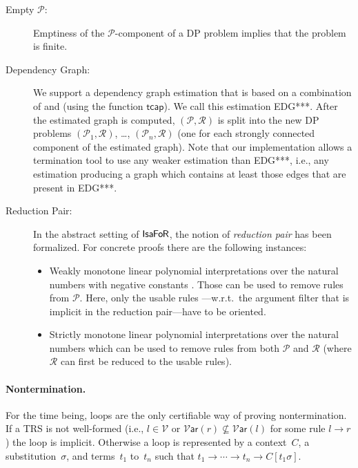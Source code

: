 \documentclass[a4paper,final]{easychair}
\theoremstyle{definition}
\newcommand\formatID[1]{\ensuremath{{\sf#1}}}
\newcommand\IsaFoR{\formatID{Isa\kern-0.10exF\kern-0.10exo\kern-0.10exR}}
\newcommand\RR{\mathcal{R}}
\newcommand\PP{\mathcal{P}}
\newcommand\tcap{\mathsf{tcap}}
\newcommand\Var{\mathcal{V}\mathsf{ar}}
\newcommand\Vars{\mathcal{V}}
\begin{document}
\begin{description}
\item[Empty $\PP$:] Emptiness of the $\PP$-component of a DP problem implies
that the problem is finite.

\item[Dependency Graph:] We support a dependency graph estimation that is based
on a combination of \cite{GTS05} and \cite{HM05} (using the function
$\tcap$). We call this estimation EDG***. After the estimated graph is computed,
$(\PP,\RR)$ is split into the new DP problems $(\PP_1,\RR)$, \ldots,
$(\PP_n,\RR)$ (one for each strongly connected component of the estimated
graph). Note that our implementation allows a termination tool to use any
weaker estimation than EDG***, i.e., any estimation producing a
graph which contains at least those edges that are present in EDG***.

\item[Reduction Pair:] In the abstract setting of \IsaFoR{}, the notion
of \emph{reduction pair} has been formalized. For concrete proofs there
are the following instances:
\begin{itemize}
  \item Weakly monotone linear polynomial interpretations over the
  natural numbers with negative constants \cite{HM07}. Those can be used to remove
  rules from $\PP$. Here, only the usable rules \cite{GTS05}---w.r.t.~the 
  argument filter that is implicit in the reduction pair---have to be oriented.

  \item Strictly monotone linear polynomial interpretations over the
  natural numbers which can be used to remove rules from both
  $\PP$ and $\RR$ (where $\RR$ can first be reduced to the usable rules).
\end{itemize}
\end{description}

\paragraph{Nontermination.}
For the time being, loops are the only certifiable way of proving
nontermination. If a TRS is not well-formed (i.e.,
$l\in\Vars$ or $\Var(r) \not\subseteq \Var(l)$ for some rule $l\to r$)
the loop is implicit. Otherwise a loop is represented by a
context~$C$, a substitution~$\sigma$, and terms~$t_1$ to~$t_n$
such that $t_1 \to \cdots \to t_n \to C[t_1\sigma]$.
\end{document}
